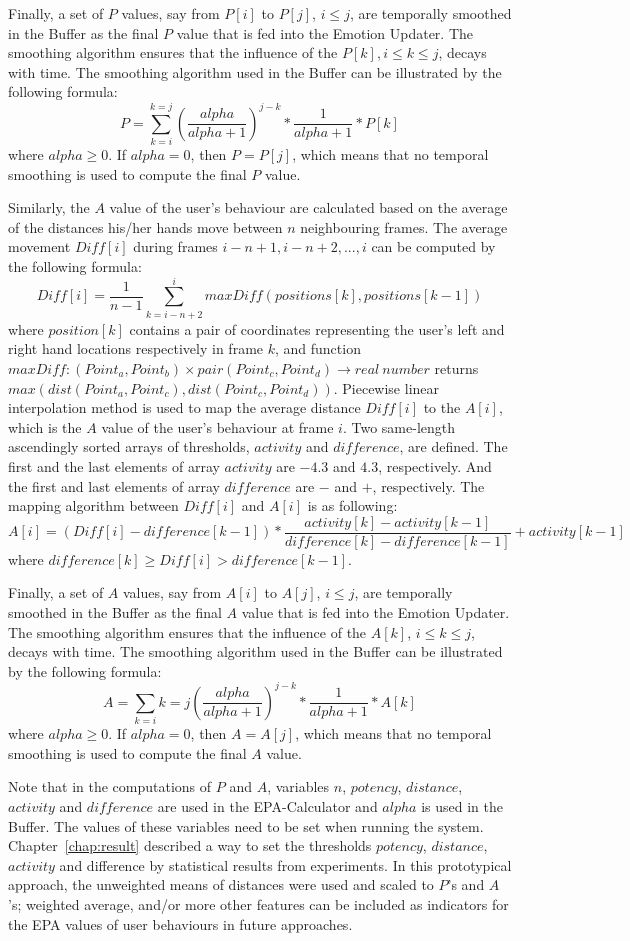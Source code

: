 Finally, a set of $P$ values, say from $P[i]$ to $P[j]$, $i \leq j$, are temporally smoothed in the Buffer as the final $P$ value that is fed into the Emotion Updater. The smoothing algorithm ensures that the influence of the $P[k], i \leq k \leq j$, decays with time. The smoothing algorithm used in the Buffer can be illustrated by the following formula:
$$P=\sum_{k=i}^{k=j}(\dfrac{alpha}{alpha+1})^{j-k}*\dfrac{1}{alpha+1}*P[k]$$ where $alpha \geq 0$.
If $alpha=0$, then $P=P[j]$, which means that no temporal smoothing is used to compute the final $P$ value.

Similarly, the $A$ value of the user's behaviour are calculated based on the average of the distances his/her hands move between $n$ neighbouring frames. The average movement $Diff[i]$ during frames $i-n+1, i-n+2, ... , i$ can be computed by the following formula:
$$Diff[i]=\dfrac{1}{n-1}\sum_{k=i-n+2}^{i}maxDiff(positions[k],positions[k-1])$$
where $position[k]$ contains a pair of coordinates representing the user's left and right hand locations respectively in frame $k$, and function $maxDiff: (Point_a, Point_b) \times pair(Point_c, Point_d) \to real\ number$ returns $max(dist(Point_a, Point_c), dist(Point_c, Point_d))$. Piecewise linear interpolation method is used to map the average distance $Diff[i]$ to the $A[i]$, which is the $A$ value of the user's behaviour at frame $i$. Two same-length ascendingly sorted arrays of thresholds, $activity$ and $difference$, are defined. The first and the last elements of array $activity$ are $-4.3$ and $4.3$, respectively. And the first and last elements of array $difference$ are $-$ and $+$, respectively. The mapping algorithm between $Diff[i]$ and $A[i]$ is as following:
$$A[i]=(Diff[i]-difference[k-1])*\dfrac{activity[k] - activity[k-1]}{difference[k] - difference[k-1]}+activity[k-1]$$
where $difference [k] \geq Diff[i] > difference[k-1]$.

Finally, a set of $A$ values, say from $A[i]$ to $A[j]$, $i \leq j$, are temporally smoothed in the Buffer as the final $A$ value that is fed into the Emotion Updater. The smoothing algorithm ensures that the influence of the $A[k]$, $i \leq k \leq j$, decays with time. The smoothing algorithm used in the Buffer can be illustrated by the following formula:
$$A=\sum_{k=i}{k=j}(\dfrac{alpha}{alpha+1})^{j-k}*\dfrac{1}{alpha+1}*A[k]$$ where $alpha \geq 0$.
If $alpha=0$, then $A=A[j]$, which means that no temporal smoothing is used to compute the final $A$ value.

Note that in the computations of $P$ and $A$, variables $n$, $potency$, $distance$, $activity$ and $difference$ are used in the EPA-Calculator and $alpha$ is used in the Buffer. The values of these variables need to be set when running the system. Chapter~\ref{chap:result} described a way to set the thresholds $potency$, $distance$, $activity$ and difference by statistical results from experiments. In this prototypical approach, the unweighted means of distances were used and scaled to $P$'s and $A$'s; weighted average, and/or more other features can be included as indicators for the EPA values of user behaviours in future approaches.

